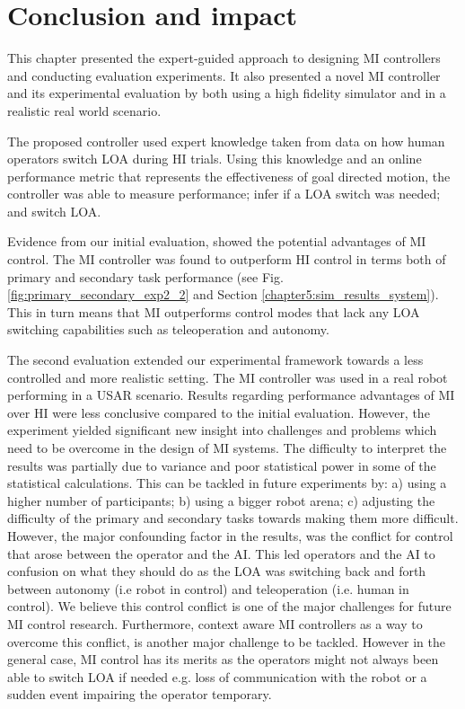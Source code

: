 \documentclass[a4paper,12pt,oneside,openright]{bhamthesis}
\begin{document}
 
\section{Conclusion and impact}
This chapter presented the expert-guided approach to designing MI controllers and conducting evaluation experiments. It also presented a novel MI controller and its experimental evaluation by both using a high fidelity simulator and in a realistic real world scenario.

The proposed controller used expert knowledge taken from data on how human operators switch LOA during HI trials. Using this knowledge and an online performance metric that represents the effectiveness of goal directed motion, the controller was able to measure performance; infer if a LOA switch was needed; and switch LOA. 

Evidence from our initial evaluation, showed the potential advantages of MI control. The MI controller was found to outperform HI control in terms both of primary and secondary task performance (see Fig. \ref{fig:primary_secondary_exp2_2} and Section \ref{chapter5:sim_results_system}). This in turn means that MI outperforms control modes that lack any LOA switching capabilities such as teleoperation and autonomy.

The second evaluation extended our experimental framework towards a less controlled and more realistic setting. The MI controller was used in a real robot performing in a USAR scenario. Results regarding performance advantages of MI over HI were less conclusive compared to the initial evaluation. However, the experiment yielded significant new insight into challenges and problems which need to be overcome in the design of MI systems. The difficulty to interpret the results was partially due to variance and poor statistical power in some of the statistical calculations. This can be tackled in future experiments by: a) using a higher number of participants; b) using a bigger robot arena; c) adjusting the difficulty of the primary and secondary tasks towards making them more difficult. However, the major confounding factor in the results, was the conflict for control that arose between the operator and the AI. This led operators and the AI to confusion on what they should do as the LOA was switching back and forth between autonomy (i.e robot in control) and teleoperation (i.e. human in control). We believe this control conflict is one of the major challenges for future MI control research. Furthermore, context aware MI controllers as a way to overcome this conflict, is another major challenge to be tackled. However in the general case, MI control has its merits as the operators might not always been able to switch LOA if needed e.g. loss of communication with the robot or a sudden event impairing the operator temporary. 
\end{document}
